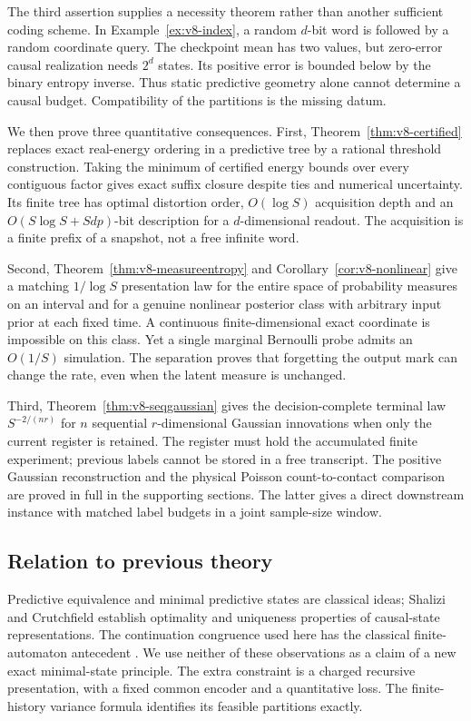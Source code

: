 The third assertion supplies a necessity theorem rather than another
sufficient coding scheme. In Example~\ref{ex:v8-index}, a random
$d$-bit word is followed by a random coordinate query. The checkpoint
mean has two values, but zero-error causal realization needs $2^d$
states. Its positive error is bounded below by the binary entropy
inverse. Thus static predictive geometry alone cannot determine a
causal budget. Compatibility of the partitions is the missing datum.

We then prove three quantitative consequences. First,
Theorem~\ref{thm:v8-certified} replaces exact real-energy ordering in a
predictive tree by a rational threshold construction. Taking the minimum
of certified energy bounds over every contiguous factor gives exact
suffix closure despite ties and numerical uncertainty. Its finite tree
has optimal distortion order, $O(\log S)$ acquisition depth and an
$O(S\log S+Sd p)$-bit description for a $d$-dimensional readout. The
acquisition is a finite prefix of a snapshot, not a free infinite word.

Second, Theorem~\ref{thm:v8-measureentropy} and
Corollary~\ref{cor:v8-nonlinear} give a matching $1/\log S$ presentation
law for the entire space of probability measures on an interval and for
a genuine nonlinear posterior class with arbitrary input prior at each
fixed time. A continuous finite-dimensional exact coordinate is
impossible on this class. Yet a single marginal Bernoulli probe admits
an $O(1/S)$ simulation. The separation proves that forgetting the output
mark can change the rate, even when the latent measure is unchanged.

Third, Theorem~\ref{thm:v8-seqgaussian} gives the decision-complete
terminal law $S^{-2/(nr)}$ for $n$ sequential $r$-dimensional Gaussian
innovations when only the current register is retained. The register
must hold the accumulated finite experiment; previous labels cannot be
stored in a free transcript. The positive Gaussian reconstruction and
the physical Poisson count-to-contact comparison are proved in full in
the supporting sections. The latter gives a direct downstream instance
with matched label budgets in a joint sample-size window.

\subsection{Relation to previous theory}
Predictive equivalence and minimal predictive states are classical
ideas; Shalizi and Crutchfield \cite{ShaliziCrutchfield2001} establish
optimality and uniqueness properties of causal-state representations.
The continuation congruence used here has the classical finite-automaton
antecedent \cite{Nerode1958}. We use neither of these observations as a
claim of a new exact minimal-state principle. The extra constraint is a
charged recursive presentation, with a fixed common encoder and a
quantitative loss. The finite-history variance formula identifies its
feasible partitions exactly.

